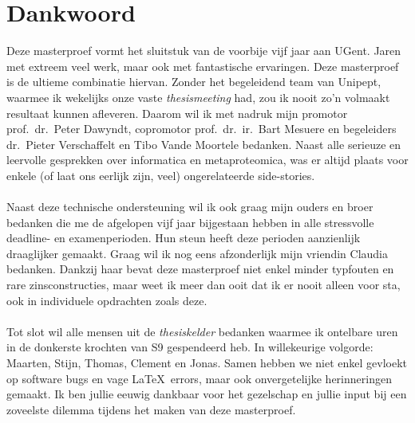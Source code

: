 \chapter*{Dankwoord}\label{ch:dankwoord}
Deze masterproef vormt het sluitstuk van de voorbije vijf jaar aan UGent.
Jaren met extreem veel werk, maar ook met fantastische ervaringen.
Deze masterproef is de ultieme combinatie hiervan.
Zonder het begeleidend team van Unipept, waarmee ik wekelijks onze vaste \textit{thesismeeting} had, zou ik nooit zo'n volmaakt resultaat kunnen afleveren.
Daarom wil ik met nadruk mijn promotor prof.~dr.~Peter Dawyndt, copromotor prof.~dr.~ir.~Bart Mesuere en begeleiders dr.~Pieter Verschaffelt en Tibo Vande Moortele bedanken.
Naast alle serieuze en leervolle gesprekken over informatica en metaproteomica, was er altijd plaats voor enkele (of laat ons eerlijk zijn, veel) ongerelateerde side-stories.
\\ \\
Naast deze technische ondersteuning wil ik ook graag mijn ouders en broer bedanken die me de afgelopen vijf jaar bijgestaan hebben in alle stressvolle deadline- en examenperioden.
Hun steun heeft deze perioden aanzienlijk draaglijker gemaakt.
Graag wil ik nog eens afzonderlijk mijn vriendin Claudia bedanken.
Dankzij haar bevat deze masterproef niet enkel minder typfouten en rare zinsconstructies, maar weet ik meer dan ooit dat ik er nooit alleen voor sta, ook in individuele opdrachten zoals deze.
\\ \\
Tot slot wil alle mensen uit de \textit{thesiskelder} bedanken waarmee ik ontelbare uren in de donkerste krochten van S9 gespendeerd heb.
In willekeurige volgorde: Maarten, Stijn, Thomas, Clement en Jonas.
Samen hebben we niet enkel gevloekt op software bugs en vage \LaTeX\ errors, maar ook onvergetelijke herinneringen gemaakt.
Ik ben jullie eeuwig dankbaar voor het gezelschap en jullie input bij een zoveelste dilemma tijdens het maken van deze masterproef.
